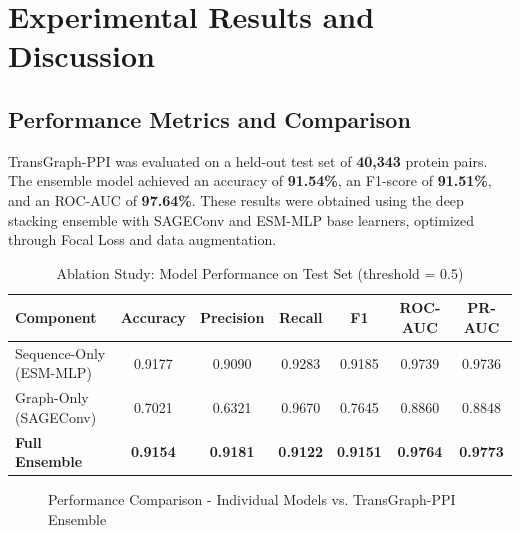 \documentclass[12pt,a4paper]{report}
\begin{document}
\chapter{Experimental Results and Discussion}
\section{Performance Metrics and Comparison}
TransGraph-PPI was evaluated on a held-out test set of \textbf{40,343} protein pairs. The ensemble model achieved an accuracy of \textbf{91.54\%}, an F1-score of \textbf{91.51\%}, and an ROC-AUC of \textbf{97.64\%}. These results were obtained using the deep stacking ensemble with SAGEConv and ESM-MLP base learners, optimized through Focal Loss and data augmentation.

\begin{table}[H]
\centering
\caption{Ablation Study: Model Performance on Test Set (threshold = 0.5)}
\begin{tabular}{|l|c|c|c|c|c|c|}
\hline
\textbf{Component} & \textbf{Accuracy} & \textbf{Precision} & \textbf{Recall} & \textbf{F1} & \textbf{ROC-AUC} & \textbf{PR-AUC} \\ \hline
Sequence-Only (ESM-MLP) & 0.9177 & 0.9090 & 0.9283 & 0.9185 & 0.9739 & 0.9736 \\ \hline
Graph-Only (SAGEConv) & 0.7021 & 0.6321 & 0.9670 & 0.7645 & 0.8860 & 0.8848 \\ \hline
\textbf{Full Ensemble} & \textbf{0.9154} & \textbf{0.9181} & \textbf{0.9122} & \textbf{0.9151} & \textbf{0.9764} & \textbf{0.9773} \\ \hline
\end{tabular}
\label{tab:ablation}
\end{table}

\begin{figure}[H]
\centering
{}
\caption{Performance Comparison - Individual Models vs. TransGraph-PPI Ensemble}
\label{fig:performance}
\end{figure}
\end{document}
